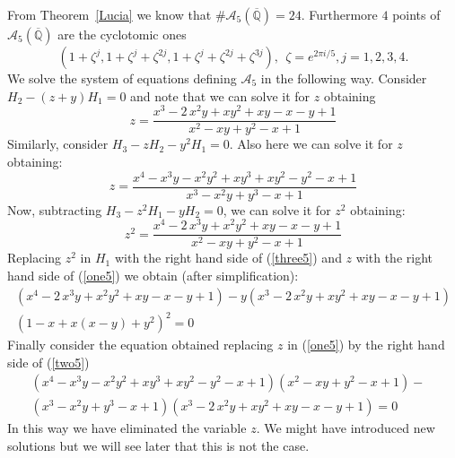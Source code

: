 \documentclass[a4paper,twoside]{article}
\begin{document}
{From} Theorem~\ref{Lucia} we know that $\#\mathcal A_5(\overline{\mathbb Q})=24$.
Furthermore $4$ points of $\mathcal A_5(\overline{\mathbb Q})$ are the cyclotomic
ones
\begin{equation}
\label{ciclo5}
(1+\zeta^j,1+\zeta^j+\zeta^{2j},1+\zeta^j+\zeta^{2j}+\zeta^{3j}),\ \ \zeta=e^{2\pi i/5}, j=1,2,3,4.
\end{equation}
We solve the system of equations defining $\mathcal A_5$ in the
following way. Consider  $H_2-(z+y)H_1=0$ and note that we can
solve it for $z$ obtaining
\begin{equation}\label{one5}z={\frac {{x}^{3}-2\,{x}^{2}y+x{y}^{2}+xy-x-y+1}{{x}^{2}-xy+{y}^{2}-x+1}
}
\end{equation}
Similarly, consider  $H_3-zH_2-y^2H_1=0$. Also here we can solve it for $z$
obtaining:
\begin{equation}\label{two5}
z=
{\frac {{x}^{4}-{x}^{3}y-{x}^{2}{y}^{2}+x{y}^{3}+x{y}^{2}-{y}^{2}-x+1}
{{x}^{3}-{x}^{2}y+{y}^{3}-x+1}}
\end{equation}
Now, subtracting $H_3-z^2H_1-yH_2=0$, we can solve it for $z^2$
obtaining:
\begin{equation}\label{three5}
z^2=
{\frac {{x}^{4}-2\,{x}^{3}y+{x}^{2}{y}^{2}+x y-x-y+1}{{x}^{2}-x y+{y}^{2}-x+1}}
\end{equation}
Replacing $z^2$ in $H_1$ with the right hand side of
(\ref{three5}) and $z$ with the right hand side of (\ref{one5}) we
obtain (after simplification):
\begin{equation}\label{four5}\begin{array}{r}
 ({{x}^{4}-2\,{x}^{3}y+{x}^{2}{y}^{2}+x y-x-y+1})-y({{x}^{3}-2\,{x}^{2}y+x{y}^{2}+x y-x-y+1})
\\
(1-x+x(x-y)+y^2)^2 =0\end{array}
\end{equation}
Finally consider the equation obtained replacing $z$ in
(\ref{one5}) by the right hand side of (\ref{two5})
\begin{equation}\label{five5}
    \begin{array}{rl}
\left({{x}^{4}-{x}^{3}y-{x}^{2}{y}^{2}+x{y}^{3}+x{y}^{2}-{y}^{2}-x+1}\right)
\left({{x}^{2}-x y+{y}^{2}-x+1}\right)-&\\
\left({{x}^{3}-{x}^{2}y+{y}^{3}-x+1}\right)\left({{x}^{3}-2\,{x}^{2}y+x{y}^{2}+x y-x-y+1}\right)=0
    \end{array}
\end{equation}
In this way we have eliminated the variable $z$. We might have introduced new solutions but we
will see later that this is not the case.
\end{document}
